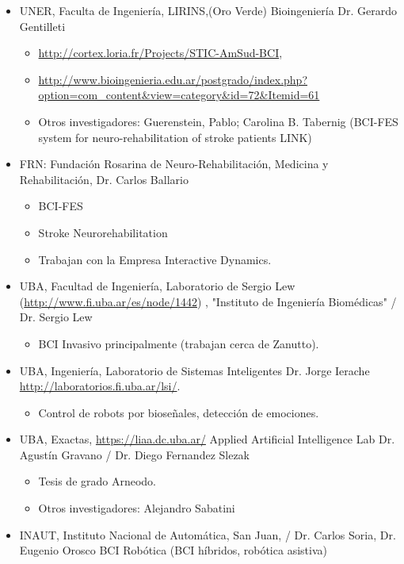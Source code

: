 \begin{itemize}
\item UNER, Faculta de Ingeniería, LIRINS,(Oro Verde) Bioingeniería  Dr. Gerardo Gentilleti
\begin{itemize}
\item \url{http://cortex.loria.fr/Projects/STIC-AmSud-BCI},
\item \url{http://www.bioingenieria.edu.ar/postgrado/index.php?option=com_content&view=category&id=72&Itemid=61}
\item Otros investigadores: Guerenstein, Pablo; Carolina B. Tabernig (BCI-FES system for neuro-rehabilitation of stroke patients LINK)
\end{itemize}
\item FRN: Fundación Rosarina de Neuro-Rehabilitación, Medicina y Rehabilitación, Dr. Carlos Ballario
\begin{itemize}
\item BCI-FES
\item Stroke Neurorehabilitation
\item Trabajan con la Empresa Interactive Dynamics. 
\end{itemize}
\item UBA, Facultad de Ingeniería, Laboratorio de Sergio Lew (\url{http://www.fi.uba.ar/es/node/1442}) , "Instituto de Ingeniería Biomédicas" / Dr. Sergio Lew
\begin{itemize}
\item BCI Invasivo principalmente (trabajan cerca de Zanutto).
\end{itemize}
\item UBA, Ingeniería, Laboratorio de Sistemas Inteligentes Dr. Jorge Ierache \url{http://laboratorios.fi.uba.ar/lsi/}.
\begin{itemize}
\item Control de robots por bioseñales, detección de emociones.
\end{itemize}
\item UBA, Exactas, \url{https://liaa.dc.uba.ar/} Applied Artificial Intelligence Lab Dr. Agustín Gravano / Dr. Diego Fernandez Slezak
\begin{itemize}
\item Tesis de grado Arneodo.
\item Otros investigadores: Alejandro Sabatini
\end{itemize}
\item INAUT, Instituto Nacional de Automática, San Juan, / Dr. Carlos Soria, Dr. Eugenio Orosco
BCI Robótica (BCI híbridos, robótica asistiva)

\end{itemize}
